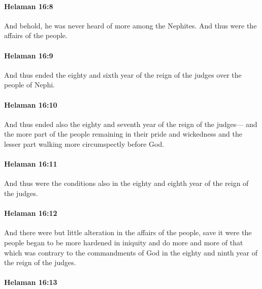 		\paragraph{Helaman 16:8} %
			\label{HELAMAN-16-8}

			And behold, he was never heard of more among the Nephites.
			And thus were the affairs of the people.

		\paragraph{Helaman 16:9} %
			\label{HELAMAN-16-9}

			And thus ended the eighty and sixth year
			of the reign of the judges over the people of Nephi.

		\paragraph{Helaman 16:10} %
			\label{HELAMAN-16-10}

			And thus ended also the eighty and seventh year of the reign of the judges---
			and the more part of the people remaining in their pride and wickedness
			and the lesser part walking more circumspectly before God.

		\paragraph{Helaman 16:11} %
			\label{HELAMAN-16-11}

			And thus were the conditions also in the eighty and eighth year
			of the reign of the judges.

		\paragraph{Helaman 16:12} %
			\label{HELAMAN-16-12}

			And there were but little alteration in the affairs of the people,
			save it were the people began to be more hardened in iniquity
			and do more and more of that which was contrary to the commandments of God
			in the eighty and ninth year of the reign of the judges.

		\paragraph{Helaman 16:13} %
			\label{HELAMAN-16-13}

